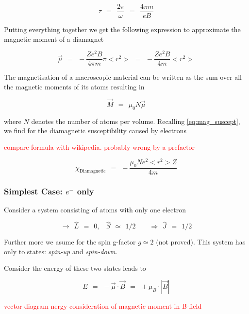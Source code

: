 \documentclass[10pt]{report}
\numberwithin{equation}{chapter}
\begin{document}
\begin{equation}
  \tau ~~=~~ \frac{2\pi}{\omega} ~~=~~ \frac{4\pi m}{e B}
\end{equation}

Putting everything together we get the following expression to approximate the magnetic moment of a diamagnet

\begin{equation} \label{eq:mag_mom_diamag}
  \vec{\mu} ~~=~~ -\frac{Z e^2 B}{4\pi m} \pi <r^2> ~~=~~ -\frac{Ze^2B}{4m} <r^2>
\end{equation}

The magnetisation of a macroscopic material can be written as the sum over all the magnetic moments of its atoms resulting in

\begin{equation}
  \vec{M} ~~=~~ \mu_0 N \vec{\mu}
\end{equation}

where $N$ denotes the number of atoms per volume. Recalling \ref{eq:mag_suscept}, we find for the diamagnetic susceptibility caused by electrons

\textcolor{red}{compare formula with wikipedia. probably wrong by a prefactor}

\begin{equation}
  \chi_\text{Diamagnetic} ~~=~~ -\frac{\mu_0 N e^2 <r^2> Z}{4m}
\end{equation}


\subsubsection{Simplest Case: $e^-$ only}

Consider a system consisting of atoms with only one electron

\begin{equation}
  \rightarrow ~~ \hat{L} ~~=~~0, ~~~~ \hat{S} ~~≃~~ 1/2 ~~~~~~~~~\Rightarrow ~~ \hat{J} ~~=~~ 1/2
\end{equation}

Further more we asume for the spin g-factor $g \simeq 2$ (not proved). This system has only to states: \textit{spin-up} and \textit{spin-down}.


Consider the energy of these two states leads to

\begin{equation}
  E ~~=~~ - \vec{\mu} \cdot \vec{B} ~~=~~ \pm \mu_B \cdot |\vec{B}|
\end{equation}

\textcolor{red}{ vector diagram nergy consideration of magnetic moment in B-field}
\end{document}
